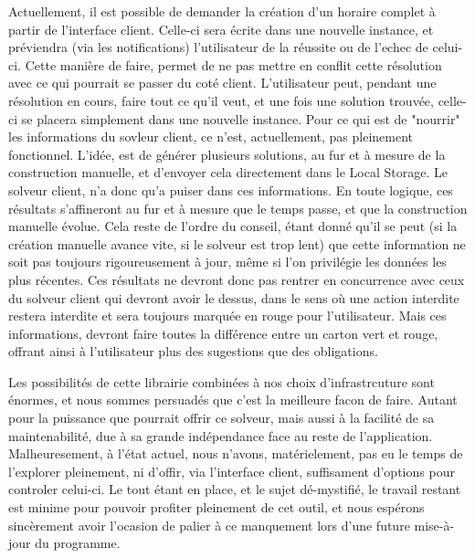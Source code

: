Actuellement, il est possible de demander la création d'un horaire complet à partir de l'interface client. Celle-ci sera écrite dans une nouvelle instance, et préviendra (via les notifications) l'utilisateur de la réussite ou de l'echec de celui-ci.  Cette manière de faire, permet de ne pas mettre en conflit cette résolution avec ce qui pourrait se passer du coté client. L'utilisateur peut, pendant une résolution en cours, faire tout ce qu'il veut, et une fois une solution trouvée, celle-ci se placera simplement dans une nouvelle instance.
Pour ce qui est de "nourrir" les informations du sovleur client, ce n'est, actuellement, pas pleinement fonctionnel. L'idée, est de générer plusieurs solutions, 
au fur et à mesure de la construction manuelle, et d'envoyer cela directement dans le Local Storage. Le solveur client, n'a donc qu'a puiser dans ces informations.
En toute logique, ces résultats s'affineront au fur et à mesure que le temps passe, et que la construction manuelle évolue. Cela reste de l'ordre du conseil, étant donné qu'il se peut (si la création manuelle avance vite, si le solveur est trop lent) que cette information ne soit pas toujours rigoureusement à jour, même si l'on privilégie les données les plus récentes.  Ces résultats ne devront donc pas rentrer en concurrence avec ceux du solveur client qui devront avoir le dessus, dans le sens où une action interdite restera interdite et sera toujours marquée en rouge pour l'utilisateur. 
Mais ces informations, devront faire toutes la différence entre un carton vert et rouge, offrant ainsi à l'utilisateur plus des sugestions que des obligations. 

Les possibilités de cette librairie combinées à nos choix d'infrastrcuture sont énormes, et nous sommes persuadés que c'est la meilleure facon de faire. Autant pour la puissance que pourrait offrir ce solveur, mais aussi à la facilité de sa maintenabilité, due à sa grande indépendance face au reste de l'application.
Malheuresement, à l'état actuel, nous n'avons, matérielement, pas eu le temps de l'explorer pleinement, ni d'offir, via l'interface client, suffisament d'options pour controler celui-ci.
Le tout étant en place, et le sujet dé-mystifié, le travail restant est minime pour pouvoir profiter pleinement de cet outil, et nous espérons sincèrement avoir l'ocasion de palier à ce manquement lors d'une future mise-à-jour du programme.
